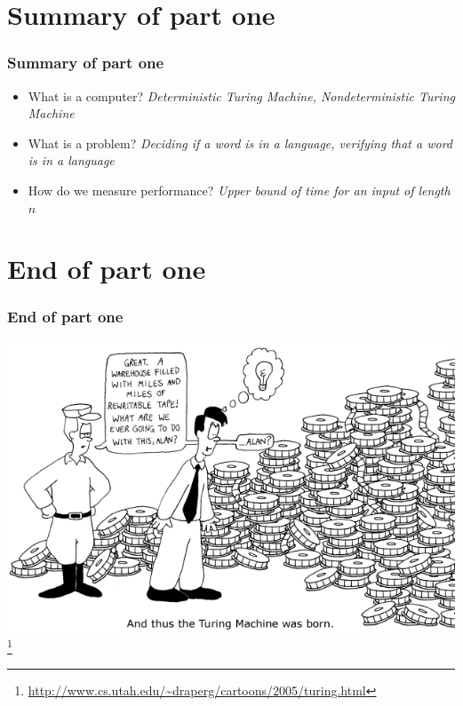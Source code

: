 \documentclass[aspectratio=169]{beamer}
\begin{document}
\section{Summary of part one}

\begin{frame}
\frametitle{Summary of part one}
\begin{itemize}
    \item What is a computer? {\em Deterministic Turing Machine, Nondeterministic Turing Machine}
    \item What is a problem? {\em Deciding if a word is in a language, verifying that a word is in a language}
    \item How do we measure performance? {\em Upper bound of time for an input of length $n$}
\end{itemize}
\end{frame}

\section{End of part one}

\begin{frame}
\frametitle{End of part one}
\begin{center}
\includegraphics{turing_comic}\footnote{\url{http://www.cs.utah.edu/~draperg/cartoons/2005/turing.html}}
\end{center}
\end{frame}

\end{document}
